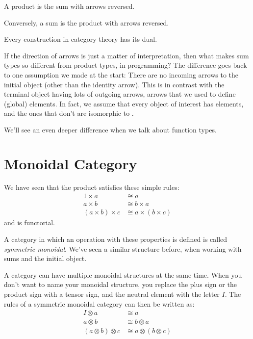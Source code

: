 \documentclass[DaoFP]{subfiles}
\begin{document}
A product is the sum with arrows reversed. 

Conversely, a sum is the product with arrows reversed. 

\medskip

Every construction in category theory has its dual.

\medskip

If the direction of arrows is just a matter of interpretation, then what makes sum types so different from product types, in programming? The difference goes back to one assumption we made at the start: There are no incoming arrows to the initial object (other than the identity arrow). This is in contrast with the terminal object having lots of outgoing arrows, arrows that we used to define (global) elements. In fact, we assume that every object of interest has elements, and the ones that don't are isomorphic to . 

We'll see an even deeper difference when we talk about function types.

\section{Monoidal Category}

We have seen that the product satisfies these simple rules:
\begin{align*}
1 \times a &\cong a
\\
a \times b &\cong b \times a
\\
(a \times b) \times c &\cong a \times (b \times c)
\end{align*}
and is functorial. 

A category in which an operation with these properties is defined is called \emph{symmetric monoidal}. We've seen a similar structure before, when working with sums and the initial object. 

A category can have multiple monoidal structures at the same time. When you don't want to name your monoidal structure, you replace the plus sign or the product sign with a tensor sign, and the neutral element with the letter $I$. The rules of a symmetric monoidal category can then be written as:
\begin{align*}
I \otimes a &\cong a
\\
a \otimes b &\cong b \otimes a
\\
(a \otimes b) \otimes c &\cong a \otimes (b \otimes c)
\end{align*}
\end{document}
